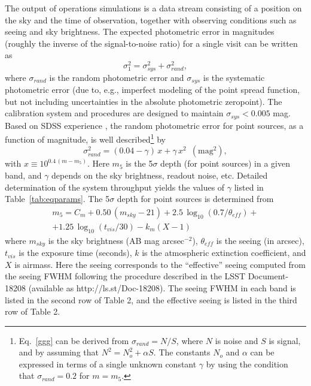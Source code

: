 The output of operations simulations is a data stream consisting of
a position on the sky and the time of observation, together with
observing conditions such as seeing and sky brightness. The expected
photometric error in magnitudes (roughly the inverse of the
signal-to-noise ratio) for a single visit can be written as
\begin{equation}
         \sigma_1^2 = \sigma_{sys}^2 + \sigma_{rand}^2,
\end{equation}
where $\sigma_{rand}$ is the random photometric error and $\sigma_{sys}$ is
the systematic photometric error (due to, e.g., imperfect
modeling of the point spread function, but not including uncertainties
in the
absolute photometric zeropoint). The calibration system and procedures
are designed to maintain $\sigma_{sys}<0.005$ mag. Based on
SDSS experience \citep{2007AJ....134.2236S}, the random photometric error for
point sources, as
a function of magnitude, is well described\footnote{Eq.~\ref{ggg} can
be derived from $\sigma_{rand}=N/S$, where $N$ is noise and $S$ is signal,
and by assuming that $N^2 = N_o^2 + \alpha S$. The constants $N_o$ and
$\alpha$ can be expressed in terms of a single unknown constant $\gamma$
by using the condition that $\sigma_{rand}=0.2$ for $m=m_5$.} by
\begin{equation}
\label{ggg}
  \sigma_{rand}^2 = (0.04-\gamma)\, x + \gamma \, x^2 \,\,\, \mathrm{(mag^2),}
\end{equation}
with $x \equiv 10^{0.4\,(m-m_5)}$. Here $m_5$ is the 5$\sigma$ depth (for
point sources) in a given band, and $\gamma$ depends on the sky
brightness, readout noise, etc.
Detailed determination of the system throughput yields the values of $\gamma$
listed in Table~\ref{tab:eqparams}. The 5$\sigma$ depth for point sources is determined from
\begin{eqnarray}
\label{m5}
  m_5 = C_m + 0.50\,(m_{sky}-21) + 2.5\,\log_{10}(0.7/\theta_{eff}) +  \nonumber \\
        + 1.25\,\log_{10}(t_{vis}/30) - k_m(X-1) \phantom{xxxxx}
\end{eqnarray}
where $m_{sky}$ is the sky brightness (AB mag arcsec$^{-2}$), $\theta_{eff}$ is
the seeing (in arcsec), $t_{vis}$ is the exposure time (seconds),
$k$ is the atmospheric extinction coefficient, and $X$ is airmass. Here
the seeing corresponds to the ``effective'' seeing computed from 
the seeing FWHM following the procedure described in the LSST Document-18208
(available as http://ls.st/Doc-18208). The seeing FWHM in each band is listed in 
the second row of Table 2, and the effective seeing is listed in the third row of 
Table 2. 

